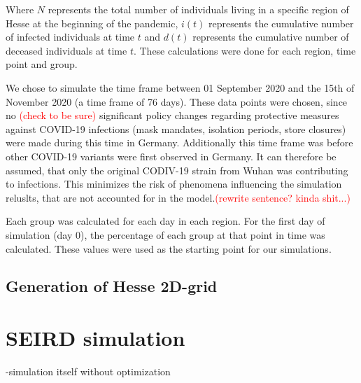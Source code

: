 \par
Where $N$ represents the total number of individuals living in a specific region of Hesse at the beginning of the pandemic, $i(t)$
represents the cumulative number of infected individuals at time $t$ and $d(t)$ represents the cumulative number of deceased
individuals at time $t$. These calculations were done for each region, time point and group.\newline

\par
We chose to simulate the time frame between 01 September 2020 and the 15{th} of November 2020 (a time frame of 76 days). These
data points were chosen, since no
\textcolor{red}{(check to be sure)} %
significant policy changes regarding protective measures against COVID-19 infections (mask mandates, isolation periods, store closures) 
were made during this time in Germany. Additionally this time frame was before other COVID-19 variants were first observed in
Germany\cite{??}. It can therefore be assumed, that only the original CODIV-19 strain from Wuhan was contributing to infections.
This minimizes the risk of phenomena influencing the simulation reluslts, that are not accounted for in the model.\textcolor{red}{(rewrite sentence? kinda shit...)}\newline

\par
Each group was calculated for each day in each region. For the first day of simulation (day 0), the percentage of each group at that
point in time was calculated. These values were used as the starting point for our simulations.


\subsection{Generation of Hesse 2D-grid}



\section{SEIRD simulation}
-simulation itself without optimization



